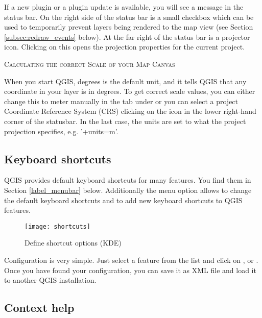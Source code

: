 If a new plugin or a plugin update is available, you will see a message in the
status bar. On the right side of the status bar is a small
checkbox which can be used to temporarily prevent layers being rendered to the
map view (see Section \ref{subsec:redraw_events} below). At the far right of
the status bar is a projector icon. Clicking on this opens the projection
properties for the current project.

\begin{Tip}\caption{\textsc{Calculating the correct Scale of your Map Canvas}}
When you start QGIS, degrees is the default unit, and it tells QGIS
that any coordinate in your layer is in degrees. To get correct scale values,
you can either change this to meter manually in the  tab under
 \arrow {} or you can select a project
Coordinate Reference System (CRS) clicking on the
icon in the lower right-hand corner of the statusbar. In the last case, the
units are set to what the project projection specifies, e.g. '+units=m'.
\end{Tip}

\subsection{Keyboard shortcuts}\label{shortcuts}

QGIS provides default keyboard shortcuts for many features. You find them in
Section \ref{label_menubar} below. Additionally the menu option  \arrow
{} allows to change the default keyboard
shortcuts and to add new keyboard shortcuts to QGIS features.

\begin{figure}[ht]
   \centering
   \texttt{[image: shortcuts]}
   \caption{Define shortcut options \nixcaption (KDE)} \label{fig:shortcuts}
\end{figure}

Configuration is very simple. Just select a feature from the list and click
on ,  or . Once you have
found your configuration, you can save it as XML file and load it to another
QGIS installation.

\subsection{Context help}\label{context_help}

